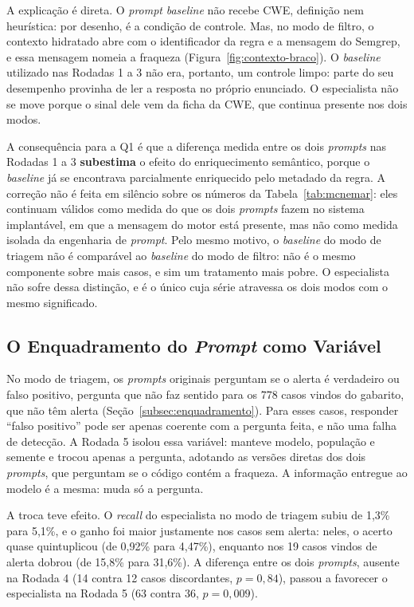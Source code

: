 A explicação é direta. O \textit{prompt} \textit{baseline} não recebe CWE, definição nem heurística: por desenho, é a condição de controle. Mas, no modo de filtro, o contexto hidratado abre com o identificador da regra e a mensagem do Semgrep, e essa mensagem nomeia a fraqueza (Figura~\ref{fig:contexto-braco}). O \textit{baseline} utilizado nas Rodadas 1 a 3 não era, portanto, um controle limpo: parte do seu desempenho provinha de ler a resposta no próprio enunciado. O especialista não se move porque o sinal dele vem da ficha da CWE, que continua presente nos dois modos.

A consequência para a Q1 é que a diferença medida entre os dois \textit{prompts} nas Rodadas 1 a 3 \textbf{subestima} o efeito do enriquecimento semântico, porque o \textit{baseline} já se encontrava parcialmente enriquecido pelo metadado da regra. A correção não é feita em silêncio sobre os números da Tabela~\ref{tab:mcnemar}: eles continuam válidos como medida do que os dois \textit{prompts} fazem no sistema implantável, em que a mensagem do motor está presente, mas não como medida isolada da engenharia de \textit{prompt}. Pelo mesmo motivo, o \textit{baseline} do modo de triagem não é comparável ao \textit{baseline} do modo de filtro: não é o mesmo componente sobre mais casos, e sim um tratamento mais pobre. O especialista não sofre dessa distinção, e é o único cuja série atravessa os dois modos com o mesmo significado.

\subsection{O Enquadramento do \textit{Prompt} como Variável}
\label{subsec:q1enquadramento}

No modo de triagem, os \textit{prompts} originais perguntam se o alerta é verdadeiro ou falso positivo, pergunta que não faz sentido para os 778 casos vindos do gabarito, que não têm alerta (Seção~\ref{subsec:enquadramento}). Para esses casos, responder ``falso positivo'' pode ser apenas coerente com a pergunta feita, e não uma falha de detecção. A Rodada 5 isolou essa variável: manteve modelo, população e semente e trocou apenas a pergunta, adotando as versões diretas dos dois \textit{prompts}, que perguntam se o código contém a fraqueza. A informação entregue ao modelo é a mesma: muda só a pergunta.

A troca teve efeito. O \textit{recall} do especialista no modo de triagem subiu de 1,3\% para 5,1\%, e o ganho foi maior justamente nos casos sem alerta: neles, o acerto quase quintuplicou (de 0,92\% para 4,47\%), enquanto nos 19 casos vindos de alerta dobrou (de 15,8\% para 31,6\%). A diferença entre os dois \textit{prompts}, ausente na Rodada 4 (14 contra 12 casos discordantes, $p = 0{,}84$), passou a favorecer o especialista na Rodada 5 (63 contra 36, $p = 0{,}009$).

